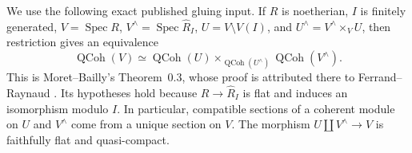 \documentclass[11pt]{article}
\theoremstyle{definition}\newtheorem{definition}[theorem]{Definition}
\theoremstyle{remark}\newtheorem{remark}[theorem]{Remark}
\newcommand{\Spec}{\operatorname{Spec}}
\begin{document}
We use the following exact published gluing input. If $R$ is noetherian, $I$ is finitely generated, $V=\Spec R$, $V^\wedge=\Spec\widehat R_I$, $U=V\setminus V(I)$, and $U^\wedge=V^\wedge\times_V U$, then restriction gives an equivalence
\begin{equation}\label{eq:module-patching}
 \operatorname{QCoh}(V)\simeq
 \operatorname{QCoh}(U)\times_{\operatorname{QCoh}(U^\wedge)}
 \operatorname{QCoh}(V^\wedge).
\end{equation}
This is Moret--Bailly's Theorem~0.3, whose proof is attributed there to Ferrand--Raynaud \citep[p.~561]{MoretBailly}. Its hypotheses hold because $R\to\widehat R_I$ is flat and induces an isomorphism modulo $I$. In particular, compatible sections of a coherent module on $U$ and $V^\wedge$ come from a unique section on $V$. The morphism $U\amalg V^\wedge\to V$ is faithfully flat and quasi-compact.
\end{document}
